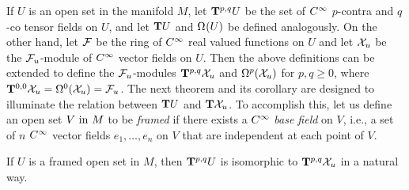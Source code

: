 \documentclass[../main]{subfiles}
\begin{document}
If $U$ is an open set in the manifold $M$, let $\tensorbundle{U}{p}{q}$ be the set of $\CInfty$ $p$-contra and $q$-co tensor fields on $U$, and let $\tangentbundle{U}$ and $\formbundle{U}{}$ be defined analogously. On the other hand, let $\realFunctions$ be the ring of $\CInfty$ real valued functions on $U$ and let $\vectorFields_u$ be the $\realFunctions_u$-module of $\CInfty$ vector fields on $U$. Then the above definitions can be extended to define the $\realFunctions_u$-modules $\tensorbundle{\vectorFields_u}{p}{q}$ and $\formbundle{\vectorFields_u}{p}$ for $p, q \ge 0$, where $\tensorbundle{\vectorFields_u}{0}{ 0} = \formbundle{\vectorFields_u}{0} = \realFunctions_u$. The next theorem and its corollary are designed to illuminate the relation between $\tangentbundle{U}$ and $\tangentbundle{\vectorFields_u}$. To accomplish this, let us define an open set $V \InText M$ to be \emph{framed} if there exists a $\CInfty$ \emph{base field} on $V$, i.e., a set of $n$ $\CInfty$ vector fields $e_1,\dots,e_n$ on $V$ that are independent at each point of $V$.



\begin{theorem} \label{thm:ch4.1}
If $U$ is a framed open set in $M$, then $\tensorbundle{U}{p}{q}$ is isomorphic to $\tensorbundle{\vectorFields_u}{p}{q}$ in a natural way.
\end{theorem}
\end{document}
